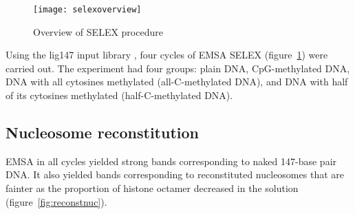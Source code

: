 \documentclass[parskip=full, numbers=noenddot]{scrreprt}
\begin{document}
\begin{figure}[htpb]
  \centering
  \texttt{[image: selexoverview]}
  \caption{Overview of SELEX procedure}
  \label{fig:selex}
\end{figure}

Using the lig147 input library \citep{zhu_interaction_2018}, four cycles of EMSA SELEX (figure~\ref{fig:selex}) were carried out.  The experiment had four groups: plain DNA, CpG-methylated DNA, DNA with all cytosines methylated (all-C-methylated DNA), and DNA with half of its cytosines methylated (half-C-methylated DNA).

\subsection{Nucleosome reconstitution}
\label{ssec:reconstnuc}

EMSA in all cycles yielded strong bands corresponding to naked 147-base pair DNA. It also yielded bands corresponding to reconstituted nucleosomes that are fainter as the proportion of histone octamer decreased in the solution (figure~\ref{fig:reconstnuc}).
\end{document}
